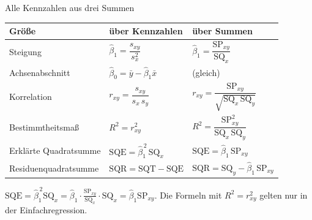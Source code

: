 \documentclass[aspectratio=169,11pt]{beamer}
\newcommand{\SQx}{\text{SQ}_x}
\newcommand{\SQy}{\text{SQ}_y}
\newcommand{\SPxy}{\text{SP}_{xy}}
\begin{document}
\begin{frame}{Alle Kennzahlen aus drei Summen}
  \begin{center}
    \renewcommand{\arraystretch}{1.55}
    \begin{tabular}{@{}l l l@{}}
      \toprule
      \textbf{Größe} & \textbf{über Kennzahlen} & \textbf{über Summen} \\
      \midrule
      Steigung              & $\hat{\beta}_1 = \dfrac{s_{xy}}{s_x^{2}}$       & $\hat{\beta}_1 = \dfrac{\SPxy}{\SQx}$ \\
      Achsenabschnitt       & $\hat{\beta}_0 = \bar{y} - \hat{\beta}_1 \bar{x}$ & (gleich) \\
      Korrelation           & $r_{xy} = \dfrac{s_{xy}}{s_x\,s_y}$             & $r_{xy} = \dfrac{\SPxy}{\sqrt{\SQx\,\SQy}}$ \\[3pt]
      Bestimmtheitsmaß      & $R^{2} = r_{xy}^{2}$                            & $R^{2} = \dfrac{\SPxy^{2}}{\SQx\,\SQy}$ \\
      Erklärte Quadratsumme & $\text{SQE} = \hat{\beta}_1^{\,2}\,\SQx$     & $\text{SQE} = \hat{\beta}_1\,\SPxy$ \\
      Residuenquadratsumme  & $\text{SQR} = \text{SQT} - \text{SQE}$   & $\text{SQR} = \SQy - \hat{\beta}_1\,\SPxy$ \\
      \bottomrule
    \end{tabular}
  \end{center}
  \footnotesize $\text{SQE} = \hat{\beta}_1^{\,2}\SQx = \hat{\beta}_1 \cdot \frac{\SPxy}{\SQx}\cdot \SQx = \hat{\beta}_1 \SPxy$.
  Die Formeln mit $R^{2} = r_{xy}^{2}$ gelten nur in der Einfachregression.
\end{frame}
\end{document}
